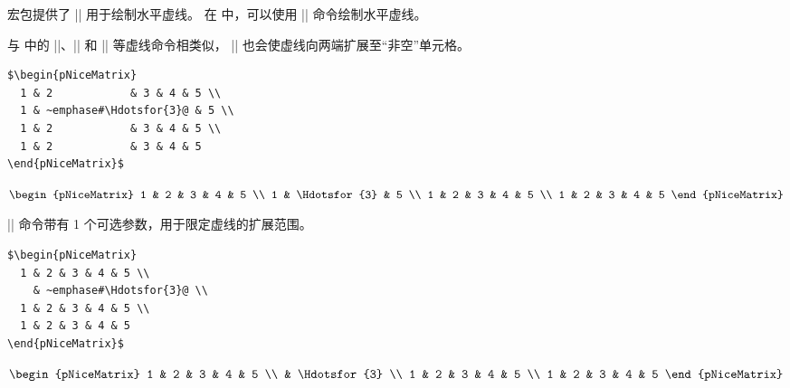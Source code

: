 \documentclass[dvipsnames]{article}%
\begin{document}
 宏包提供了 |\hdotsfor| 用于绘制水平虚线。
在  中，可以使用 |\Hdotsfor| 命令绘制水平虚线。


与  中的 |\Cdots|、|\Ldots| 和 |\Vdots| 等虚线命令相类似，
 |\Hdotsfor| 也会使虚线向两端扩展至“非空”单元格。

\bigskip
\begin{BVerbatim}[baseline=c,boxwidth=7cm]
$\begin{pNiceMatrix}
  1 & 2            & 3 & 4 & 5 \\
  1 & ~emphase#\Hdotsfor{3}@ & 5 \\
  1 & 2            & 3 & 4 & 5 \\
  1 & 2            & 3 & 4 & 5 
\end{pNiceMatrix}$
\end{BVerbatim}
$\begin{pNiceMatrix}
1 & 2 & 3 & 4 & 5 \\
1 & \Hdotsfor{3} & 5 \\
1 & 2 & 3 & 4 & 5 \\
1 & 2 & 3 & 4 & 5 
\end{pNiceMatrix}$

\bigskip
|\Hdotsfor| 命令带有 1 个可选参数，用于限定虚线的扩展范围。

\bigskip
\begin{BVerbatim}[baseline=c,boxwidth=7cm]
$\begin{pNiceMatrix}
  1 & 2 & 3 & 4 & 5 \\
    & ~emphase#\Hdotsfor{3}@ \\
  1 & 2 & 3 & 4 & 5 \\
  1 & 2 & 3 & 4 & 5 
\end{pNiceMatrix}$
\end{BVerbatim}
$\begin{pNiceMatrix}
1 & 2 & 3 & 4 & 5 \\
 & \Hdotsfor{3} \\
1 & 2 & 3 & 4 & 5 \\
1 & 2 & 3 & 4 & 5 
\end{pNiceMatrix}$
\end{document}
